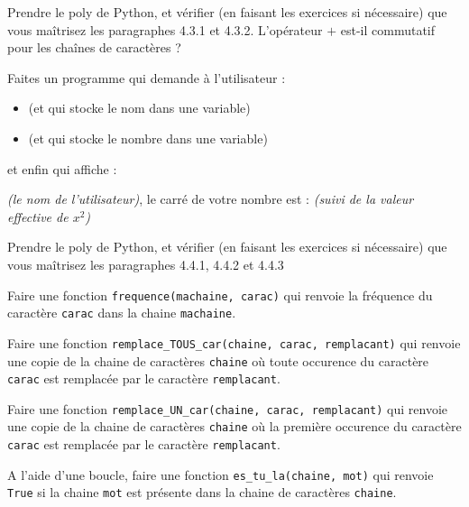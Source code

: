 \begin{enonce}



\ques Prendre le poly de Python, et vérifier (en faisant les exercices si nécessaire) que vous maîtrisez les paragraphes 4.3.1 et 4.3.2. L'opérateur $+$ est-il commutatif pour les chaînes de caractères ?

\ques Faites un programme qui demande à l'utilisateur :
\begin{itemize}
\item {} (et qui stocke le nom dans une variable)
\item {} (et qui stocke le nombre dans une variable)
\end{itemize}
et enfin qui affiche :

\cita
{\em (le nom de l'utilisateur)}, le carré de votre nombre est : {\em (suivi de la valeur effective de $x^2$)}
\atic


\ques Prendre le poly de Python, et vérifier (en faisant les exercices si nécessaire) que vous maîtrisez les paragraphes 4.4.1, 4.4.2 et 4.4.3

\ques Faire une fonction \texttt{frequence(machaine, carac)}  qui renvoie la fréquence du caractère \texttt{carac} dans la chaine \texttt{machaine}.

\ques  Faire une fonction  \texttt{remplace\_TOUS\_car(chaine, carac, remplacant)} qui renvoie une copie de la chaine de caract\`{e}res \texttt{chaine} où  toute occurence du  caract\`{e}re \texttt{carac} est remplacée par le caractère \texttt{remplacant}.


\ques  Faire une fonction  \texttt{remplace\_UN\_car(chaine, carac, remplacant)} qui renvoie une copie de la chaine de caract\`{e}res \texttt{chaine} où  la premi\`{e}re occurence du  caract\`{e}re \texttt{carac} est remplacée par le caractère \texttt{remplacant}.



\ques  A l'aide d'une boucle, faire une fonction \texttt{es\_tu\_la(chaine, mot)} qui renvoie \texttt{True} si la chaine \texttt{mot}  est présente dans la chaine de caract\`{e}res \texttt{chaine}.



\end{enonce}
